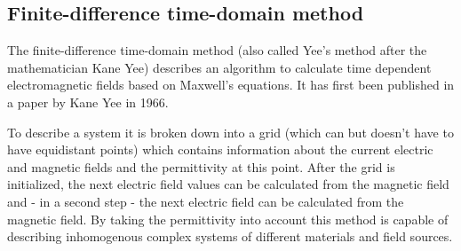 \subsection{Finite-difference time-domain method}

The finite-difference time-domain method (also called Yee's method after the mathematician Kane Yee) describes an algorithm to calculate time dependent electromagnetic fields based on Maxwell's equations. It has first been published in a paper by Kane Yee in 1966\cite{yee}.

To describe a system it is broken down into a grid (which can but doesn't have to have equidistant points) which contains information about the current electric and magnetic fields and the permittivity at this point. After the grid is initialized, the next electric field values can be calculated from the magnetic field and - in a second step - the next electric field can be calculated from the magnetic field. By taking the permittivity into account this method is capable of describing inhomogenous complex systems of different materials and field sources.
